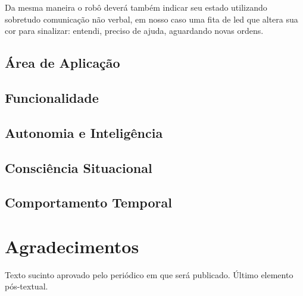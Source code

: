 \documentclass[
	article,			%
	11pt,				%
	oneside,			%
	a4paper,			%
	english,			%
	brazil,				%
	sumario=tradicional	
	]{abntex2}
\begin{document}
Da mesma maneira o robô deverá também indicar seu estado utilizando sobretudo comunicação não verbal, em nosso caso uma fita de led que altera sua cor para sinalizar: entendi, preciso de ajuda, aguardando novas ordens.


\subsection{Área de Aplicação}
\subsection{Funcionalidade}
\subsection{Autonomia e Inteligência}
\subsection{Consciência Situacional}
\subsection{Comportamento Temporal}

\postextual




\section*{Agradecimentos}
Texto sucinto aprovado pelo periódico em que será publicado. Último 
elemento pós-textual.
\end{document}
